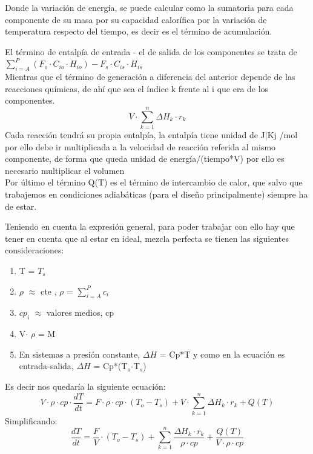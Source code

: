 \begin{flushleft}
  \noindent Donde la variación de energía, se puede calcular como la sumatoria para cada componente de su masa por su capacidad calorífica por la variación de temperatura respecto del tiempo, es decir es el término de acumulación.

  \vspace{1\baselineskip}
  El término de entalpía de entrada - el de salida de los componentes se trata de $ \sum_{i=A}^{P} (F_o \cdot C_{io} \cdot H_{io}) - F_s \cdot C_{is} \cdot H_{is}$\\
  \vspace{1\baselineskip}
  Mientras que el término de generación a diferencia del anterior depende de las reacciones químicas, de ahí que sea el índice k frente al i que era de los componentes.
  \begin{equation*}
    V \cdot \sum_{k=1}^{n} \Delta H_k \cdot r_k
  \end{equation*}
  Cada reacción tendrá su propia entalpía, la entalpía tiene unidad de J|Kj /mol por ello debe ir multiplicada a la velocidad de reacción referida al mismo componente, de forma que queda unidad de energía/(tiempo*V) por ello es necesario multiplicar el volumen \\
  \vspace{1\baselineskip}
  Por último el término Q(T) es el término de intercambio de calor, que salvo que trabajemos en condiciones adiabáticas (para el diseño principalmente) siempre ha de estar.

  Teniendo en cuenta la expresión general, para poder trabajar con ello hay que tener en cuenta que al estar en ideal, mezcla perfecta se tienen las siguientes consideraciones:
\end{flushleft}
\begin{enumerate}[label=\bfseries\tiny\protect\circled{\small\arabic*}]
  \item \label{n:1} T = $T_s$
  \item \label{n:2} $\rho$ $\approx$ cte ,\hspace{0.1cm} $\rho$ = $\sum_{i=A}^{P} c_i$
  \item \label{n:3} $cp_i$ $\approx$ valores medios, cp
  \item \label{n:4} V$\cdot$ $\rho$ = M
  \item \label{n:5} En sistemas a presión constante, $\Delta H$ = Cp*T y como en la ecuación es entrada-salida, $\Delta H$ = Cp*(T$_o$-T$_s$)
\end{enumerate}
Es decir nos quedaría la siguiente ecuación:
\begin{equation}
  V \cdot \rho \cdot cp \cdot \frac{dT}{dt} = F \cdot  \rho \cdot cp \cdot (T_o - T_s) + V \cdot \sum_{k=1}^{n} \Delta H_k \cdot r_k + Q(T)
\end{equation}
Simplificando:
\begin{equation}
  \frac{dT}{dt} = \frac{F}{V} \cdot (T_o - T_s) +  \sum_{k=1}^{n} \frac{\Delta H_k \cdot r_k}{\rho \cdot cp} + \frac{Q(T)}{V \cdot \rho \cdot cp}
\end{equation}
\newpage

